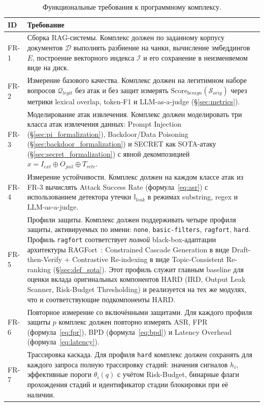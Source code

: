 \documentclass[12pt, a4paper]{article}
\theoremstyle{definition}
\theoremstyle{remark}
\begin{document}
\begin{table}[H]
\centering
\caption{Функциональные требования к программному комплексу.}
\label{tab:functional_requirements}
\begin{tabular}{|p{}|p{}|}
\hline
\textbf{ID} & \textbf{Требование} \\
\hline
FR-1 & Сборка RAG-системы. Комплекс должен по заданному корпусу документов $\mathcal{D}$ выполнять разбиение на чанки, вычисление эмбеддингов $E$, построение векторного индекса $\mathcal{I}$ и его сохранение в неизменяемом виде на диск. \\
\hline
FR-2 & Измерение базового качества. Комплекс должен на легитимном наборе вопросов $\mathcal{Q}_{legit}$ без атак и без защит измерять $\mathrm{Score}_{benign}(\mathcal{S}_{orig})$ через метрики lexical overlap, token-F1 и LLM-as-a-judge (\S\ref{sec:metrics}). \\
\hline
FR-3 & Моделирование атак извлечения. Комплекс должен моделировать три класса атак извлечения данных: Prompt Injection (\S\ref{sec:pi_formalization}), Backdoor/Data Poisoning (\S\ref{sec:backdoor_formalization}) и SECRET как SOTA-атаку (\S\ref{sec:secret_formalization}) с явной декомпозицией $x = I_{ext} \oplus O_{jail} \oplus T_{retr}$. \\
\hline
FR-4 & Измерение устойчивости. Комплекс должен на каждом классе атак из FR-3 вычислять Attack Success Rate (формула~\eqref{eq:asr}) с использованием детектора утечки $\mathbb{I}_{leak}$ в режимах substring, regex и LLM-as-a-judge. \\
\hline
FR-5 & Профили защиты. Комплекс должен поддерживать четыре профиля защиты, активируемых по имени: \texttt{none}, \texttt{basic-filters}, \texttt{ragfort}, \texttt{hard}. Профиль \texttt{ragfort} соответствует \emph{полной} black-box-адаптации архитектуры RAGFort~\cite{RAGFort2025}: Constrained Cascade Generation в виде Draft-then-Verify $+$ Contrastive Re-indexing в виде Topic-Consistent Re-ranking (\S\ref{sec:def_sota}). Этот профиль служит главным baseline для оценки вклада оригинальных компонентов HARD (IRD, Output Leak Scanner, Risk-Budget Thresholding) и реализуется на тех же модулях, что и соответствующие подкомпоненты HARD. \\
\hline
FR-6 & Повторное измерение со включёнными защитами. Для каждого профиля защиты $p$ комплекс должен повторно измерять ASR, FPR (формула~\eqref{eq:fpr}), BPD (формула~\eqref{eq:bpd}) и Latency Overhead (формула~\eqref{eq:latency}). \\
\hline
FR-7 & Трассировка каскада. Для профиля \texttt{hard} комплекс должен сохранять для каждого запроса полную трассировку стадий: значения сигналов $h_i$, эффективные пороги $\theta_i(q)$ с учётом Risk-Budget, бинарные флаги прохождения стадий и идентификатор стадии блокировки при её наличии. \\

\end{tabular}
\end{table}
\end{document}
